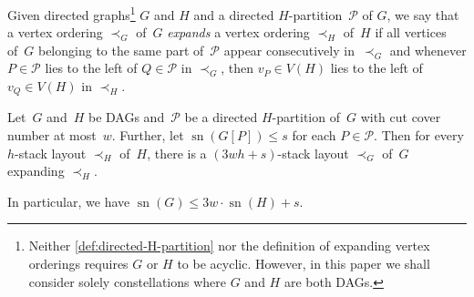 \documentclass{theoretics}
\DeclareMathOperator{\sn}{sn}
\newcommand{\calP}{\ensuremath{\mathcal{P}}\xspace}
\newcommand{\Hpartition}{$H$\nobreakdash-partition\xspace}
\begin{document}
\newpage%
Given directed graphs\footnote{Neither \cref{def:directed-H-partition} nor the definition of expanding vertex orderings requires $G$ or $H$ to be acyclic. However, in this paper we shall consider solely constellations where $G$ and $H$ are both DAGs.} $G$ and $H$ and a directed \Hpartition~$\calP$ of $G$, we say that a vertex ordering $\prec_G$ of~$G$ \emph{expands} a vertex ordering $\prec_H$ of~$H$ if all vertices of~$G$ belonging to the same part of~$\calP$ appear consecutively in~$\prec_G$ and whenever $P \in \calP$ lies to the left of $Q \in \calP$ in $\prec_G$, then $v_P \in V(H)$ lies to the left of $v_Q \in V(H)$ in $\prec_H$.

\begin{lemma}
\label{lem:bounded_H_partition_to_stack_layout}
    Let~$G$ and~$H$ be DAGs and~\calP be a directed \Hpartition of~$G$ with cut cover number at most~$w$.
    Further, let $\sn(G[P]) \leq s$ for each $P \in \calP$.
    Then for every $h$-stack layout $\prec_H$ of~$H$, there is a $(3wh + s)$-stack layout $\prec_G$ of~$G$ expanding $\prec_H$.
    
    In particular, we have $\sn(G) \leq 3w \cdot \sn(H) + s$.    
\end{lemma}
\end{document}

